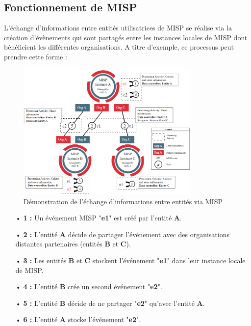 \newpage

\subsection{Fonctionnement de MISP}

L'échange d'informations entre entités utilisatrices de MISP se réalise via la création d'évènements qui sont partagés entre les instances locales de MISP dont bénéficient les différentes organisations. A titre d'exemple, ce processus peut prendre cette forme :\\

\vspace{1em}

\begin{figure}[h]%
    \center%
    \includegraphics[width=0.8\textwidth]{assets/misp-compliance-gdpr.png}
    \caption[Démonstration de l'échange d'informations entre entités via MISP (source: \href{https://www.misp-project.org/compliance/GDPR/}{www.misp-project.org})]{Démonstration de l'échange d'informations entre entités via MISP}\label{fig:misp-compliance-gdpr}
\end{figure}

\vspace{1em}

\begin{itemize}[itemsep=0.8em]
    \item[•] \textbf{1 :} Un événement MISP "\textbf{e1}" est créé par l'entité \textbf{A}.
    \item[•] \textbf{2 :} L'entité \textbf{A} décide de partager l'événement avec des organisations distantes partenaires (entités \textbf{B} et \textbf{C}).
    \item[•] \textbf{3 :} Les entités \textbf{B} et \textbf{C} stockent l'événement "\textbf{e1}" dans leur instance locale de MISP.
    \item[•] \textbf{4 :} L'entité \textbf{B} crée un second événement "\textbf{e2}".
    \item[•] \textbf{5 :} L'entité \textbf{B} décide de ne partager "\textbf{e2}" qu'avec l'entité \textbf{A}.
    \item[•] \textbf{6 :} L'entité \textbf{A} stocke l'événement "\textbf{e2}".\\
\end{itemize}

